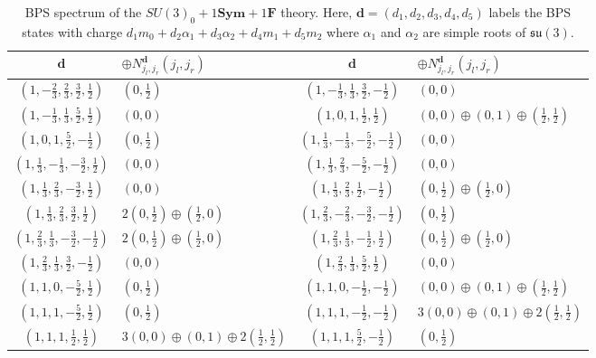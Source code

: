 \begin{table}
	\centering
	\begin{tabular}{|c|C{19ex}||c|C{19ex}|} \hline
		$ \mathbf{d} $ & $ \oplus N_{j_l, j_r}^{\mathbf{d}} (j_l, j_r) $ & $ \mathbf{d} $ & $ \oplus N_{j_l, j_r}^{\mathbf{d}} (j_l, j_r) $ \\ \hline
		$ (1, -\frac{2}{3}, \frac{2}{3}, \frac{3}{2}, \frac{1}{2}) $ & $ (0, \frac{1}{2}) $ & $ (1, -\frac{1}{3}, \frac{1}{3}, \frac{3}{2}, -\frac{1}{2}) $ & $ (0, 0) $ \\ \hline
		$ (1, -\frac{1}{3}, \frac{1}{3}, \frac{5}{2}, \frac{1}{2}) $ & $ (0, 0) $ & $ (1, 0, 1, \frac{1}{2}, \frac{1}{2}) $ & $ \! (0, 0) \oplus (0, 1) \oplus (\frac{1}{2}, \frac{1}{2}) \! $ \\ \hline
		$ (1, 0, 1, \frac{5}{2}, -\frac{1}{2}) $ & $ (0, \frac{1}{2}) $ & $ (1, \frac{1}{3}, -\frac{1}{3}, -\frac{5}{2}, -\frac{1}{2}) $ & $ (0, 0) $ \\ \hline
		$ (1, \frac{1}{3}, -\frac{1}{3}, -\frac{3}{2}, \frac{1}{2}) $ & $ (0, 0) $ & $ (1, \frac{1}{3}, \frac{2}{3}, -\frac{5}{2}, -\frac{1}{2}) $ & $ (0, 0) $ \\ \hline
		$ (1, \frac{1}{3}, \frac{2}{3}, -\frac{3}{2}, \frac{1}{2}) $ & $ (0, 0) $ & $ (1, \frac{1}{3}, \frac{2}{3}, \frac{1}{2}, -\frac{1}{2}) $ & $ (0, \frac{1}{2}) \oplus (\frac{1}{2}, 0) $ \\ \hline
		$ (1, \frac{1}{3}, \frac{2}{3}, \frac{3}{2}, \frac{1}{2}) $ & $ 2(0, \frac{1}{2}) \oplus (\frac{1}{2}, 0) $ & $ (1, \frac{2}{3}, -\frac{2}{3}, -\frac{3}{2}, -\frac{1}{2}) $ & $ (0, \frac{1}{2}) $ \\ \hline
		$ (1, \frac{2}{3}, \frac{1}{3}, -\frac{3}{2}, -\frac{1}{2}) $ & $ 2(0, \frac{1}{2}) \oplus (\frac{1}{2}, 0) $ & $ (1, \frac{2}{3}, \frac{1}{3}, -\frac{1}{2}, \frac{1}{2}) $ & $ (0, \frac{1}{2}) \oplus (\frac{1}{2}, 0) $ \\ \hline
		$ (1, \frac{2}{3}, \frac{1}{3}, \frac{3}{2}, -\frac{1}{2}) $ & $ (0, 0) $ & $ (1, \frac{2}{3}, \frac{1}{3}, \frac{5}{2}, \frac{1}{2}) $ & $ (0, 0) $ \\ \hline
		$ (1, 1, 0, -\frac{5}{2}, \frac{1}{2}) $ & $ (0, \frac{1}{2}) $ & $ (1, 1, 0, -\frac{1}{2}, -\frac{1}{2}) $ & $ \! (0, 0) \oplus (0, 1) \oplus (\frac{1}{2}, \frac{1}{2}) \! $ \\ \hline
		$ (1, 1, 1, -\frac{5}{2}, \frac{1}{2}) $ & $ (0, \frac{1}{2}) $ & $ (1, 1, 1, -\frac{1}{2}, -\frac{1}{2}) $ & $ 3(0, 0) \oplus (0, 1) \oplus 2(\frac{1}{2}, \frac{1}{2}) $ \\ \hline
		$ (1, 1, 1, \frac{1}{2}, \frac{1}{2}) $ & $ 3(0, 0) \oplus (0, 1) \oplus 2(\frac{1}{2}, \frac{1}{2}) $ & $ (1, 1, 1, \frac{5}{2}, -\frac{1}{2}) $ & $ (0, \frac{1}{2}) $ \\ \hline
	\end{tabular}
	\caption{BPS spectrum of the $SU(3)_0 + 1\mathbf{Sym} + 1\mathbf{F}$ theory. Here, $ \mathbf{d} = (d_1, d_2, d_3, d_4, d_5) $ labels the BPS states with charge $ d_1 m_0 + d_2 \alpha_1 + d_3 \alpha_2 + d_4 m_1 + d_5 m_2 $ where $ \alpha_1 $ and $ \alpha_2 $ are simple roots of $ \mathfrak{su}(3) $. } \label{table:SU3_sym_F}
\end{table}


